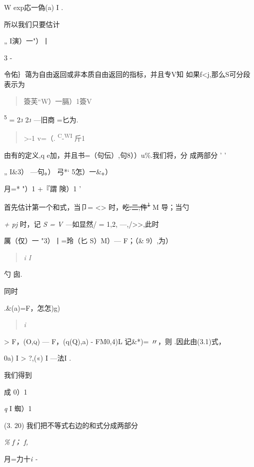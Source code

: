 W exp応一偽(a) I .

所以我们只要估计

„ I演）一"）丨

3 -

令佑｝蔼为自由返回或非本质自由返回的指标，并且专V知
如果f\textless{}j,那么S可分段表示为

\begin{quote}
簽芙``W）一膈）1簽V
\end{quote}

\textsc{\textsuperscript{5} = 2j 2j} ---旧商 =匕为.

\begin{quote}
\textgreater{}-1 v=（.
\textsuperscript{\textbar{}C}-\textsuperscript{WI} 斤1
\end{quote}

由有的定义,q e加，并且书=（句伝）,句8））u\%.我们将，分 成两部分 ' '

„ I\&3） ---句。）\textbar{} 弓*` \textbar{}5怎）一\&。）\textbar{}

月=* "）1 +『謂 険）1 '

首先估计第一个和式，当卩= \textless{}\textgreater{}
时，\sout{吃:二;件\textsuperscript{1}} M 导；当勺

\emph{+ pj} 时，记 \emph{S = V ---}如显然/ = 1,2,
---,/\textgreater{}\textgreater{},此时

厲（仅）一 "3）丨=\textbar{}玲（匕 S）M）--- F；（\& 9）,为）\textbar{}

\begin{quote}
\emph{i I}
\end{quote}

勺 \textbar{}囱\textbar{}.

同时

.\textbar{}\&(a)\textbar{}=\textbar{}F，怎怎)g)\textbar{}

\begin{quote}
\emph{i}
\end{quote}

\textsc{\textgreater{} \textbar{}F，(O,q)\textbar{}} ---
\textbar{}F，(q(Q),a) - FM0,4)L 记\&*)= 〃，则 .因此由(3.1)式，

0a) I \textgreater{} \textbar{}?,(«) I ---法I \textbar{}.

我们得到

成 {0）1}

\emph{q} I 蜘）1

(3. 20) 我们把不等式右边的和式分成两部分

\emph{\% f； f,}

月=力十\emph{i -}

